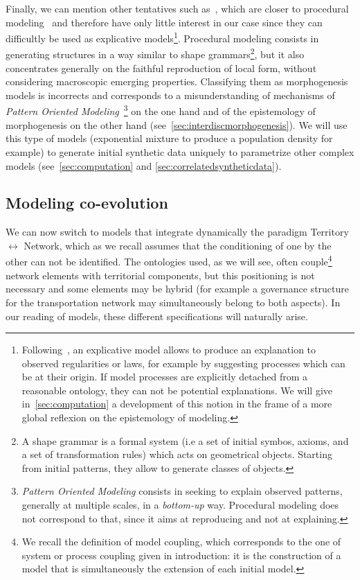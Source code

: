 \documentclass[galley]{jtlu-article-2col}
\begin{document}
Finally, we can mention other tentatives such as~\cite{de2007netlogo,yamins2003growing}, which are closer to procedural modeling~\cite{lechner2004procedural,watson2008procedural} and therefore have only little interest in our case since they can difficultly be used as explicative models\footnote{Following~\cite{varenne2017theories}, an explicative model allows to produce an explanation to observed regularities or laws, for example by suggesting processes which can be at their origin. If model processes are explicitly detached from a reasonable ontology, they can not be potential explanations. We will give in~\ref{sec:computation} a development of this notion in the frame of a more global reflexion on the epistemology of modeling.}. Procedural modeling consists in generating structures in a way similar to shape grammars\footnote{A shape grammar is a formal system (i.e a set of initial symbos, axioms, and a set of transformation rules) which acts on geometrical objects. Starting from initial patterns, they allow to generate classes of objects.}, but it also concentrates generally on the faithful reproduction of local form, without considering macroscopic emerging properties. Classifying them as morphogenesis models is incorrects and corresponds to a misunderstanding of mechanisms of \emph{Pattern Oriented Modeling}~\cite{grimm2005pattern}\footnote{\emph{Pattern Oriented Modeling} consists in seeking to explain observed patterns, generally at multiple scales, in a \emph{bottom-up} way. Procedural modeling does not correspond to that, since it aims at reproducing and not at explaining.} on the one hand and of the epistemology of morphogenesis on the other hand (see~\ref{sec:interdiscmorphogenesis}). We will use this type of models (exponential mixture to produce a population density for example) to generate initial synthetic data uniquely to parametrize other complex models (see~\ref{sec:computation} and \ref{sec:correlatedsyntheticdata}).

\subsection{Modeling co-evolution}

We can now switch to models that integrate dynamically the paradigm Territory $\leftrightarrow$ Network, which as we recall assumes that the conditioning of one by the other can not be identified. The ontologies used, as we will see, often couple\footnote{We recall the definition of model coupling, which corresponds to the one of system or process coupling given in introduction: it is the construction of a model that is simultaneously the extension of each initial model.} network elements with territorial components, but this positioning is not necessary and some elements may be hybrid (for example a governance structure for the transportation network may simultaneously belong to both aspects). In our reading of models, these different specifications will naturally arise.
\end{document}
